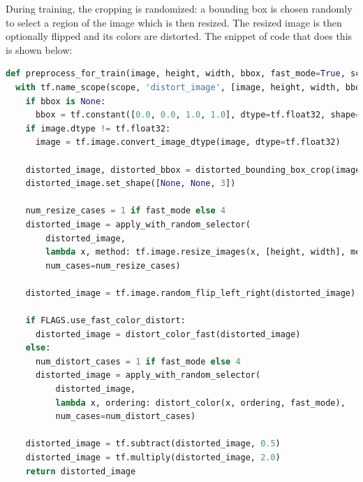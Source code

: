 \documentclass[14pt]{report}
\begin{document}
				During training, the cropping is randomized: a bounding box is chosen randomly to select a region of the image which is then resized. The resized image is then optionally flipped and its colors are distorted. The snippet of code that does this is shown below:\\
				\begin{lstlisting}[language=Python]
def preprocess_for_train(image, height, width, bbox, fast_mode=True, scope=None):
  with tf.name_scope(scope, 'distort_image', [image, height, width, bbox]):
    if bbox is None:
      bbox = tf.constant([0.0, 0.0, 1.0, 1.0], dtype=tf.float32, shape=[1, 1, 4])
    if image.dtype != tf.float32:
      image = tf.image.convert_image_dtype(image, dtype=tf.float32)

    distorted_image, distorted_bbox = distorted_bounding_box_crop(image, bbox)
    distorted_image.set_shape([None, None, 3])

    num_resize_cases = 1 if fast_mode else 4
    distorted_image = apply_with_random_selector(
        distorted_image,
        lambda x, method: tf.image.resize_images(x, [height, width], method),
        num_cases=num_resize_cases)

    distorted_image = tf.image.random_flip_left_right(distorted_image)

    if FLAGS.use_fast_color_distort:
      distorted_image = distort_color_fast(distorted_image)
    else:
      num_distort_cases = 1 if fast_mode else 4
      distorted_image = apply_with_random_selector(
          distorted_image,
          lambda x, ordering: distort_color(x, ordering, fast_mode),
          num_cases=num_distort_cases)

    distorted_image = tf.subtract(distorted_image, 0.5)
    distorted_image = tf.multiply(distorted_image, 2.0)
    return distorted_image
				\end{lstlisting}
\end{document}
